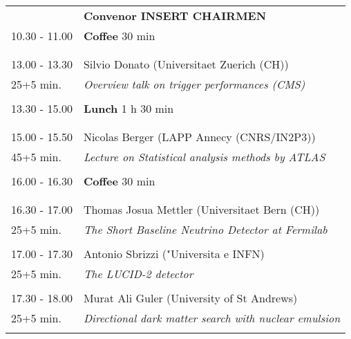\begin{longtable}{p{3cm}p{13cm}}
&\hfill {\bf Convenor INSERT CHAIRMEN }\\ 
10.30 - 11.00 & {\bf Coffee} \hfill 30 min \\ 
 & \\ 
 & \\ 
13.00 - 13.30 & Silvio Donato (Universitaet Zuerich (CH))\\ 
25+5 min. & {\it Overview talk on trigger performances (CMS)}\\ 
 & \\ 
13.30 - 15.00 & {\bf Lunch} \hfill 1 h 30 min \\ 
 & \\ 
 & \\ 
15.00 - 15.50 & Nicolas Berger (LAPP Annecy (CNRS/IN2P3))\\ 
45+5 min. & {\it Lecture on Statistical analysis methods by ATLAS}\\ 
 & \\ 
16.00 - 16.30 & {\bf Coffee} \hfill 30 min \\ 
 & \\ 
 & \\ 
16.30 - 17.00 & Thomas Josua Mettler (Universitaet Bern (CH))\\ 
25+5 min. & {\it The Short Baseline Neutrino Detector at Fermilab}\\ 
 & \\ 
17.00 - 17.30 & Antonio Sbrizzi ("Universita e INFN)\\ 
25+5 min. & {\it The LUCID-2 detector}\\ 
 & \\ 
17.30 - 18.00 & Murat Ali Guler (University of St Andrews)\\ 
25+5 min. & {\it Directional dark matter search with nuclear emulsion}\\ 
 & \\ 
\end{longtable}

